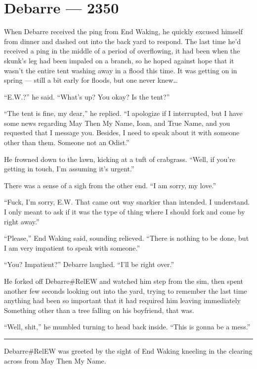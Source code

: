 \hypertarget{debarre-2350}{%
\chapter{Debarre — 2350}\label{debarre-2350}}

When Debarre received the ping from End Waking, he quickly excused himself from dinner and dashed out into the back yard to respond. The last time he'd received a ping in the middle of a period of overflowing, it had been when the skunk's leg had been impaled on a branch, so he hoped against hope that it wasn't the entire tent washing away in a flood this time. It was getting on in spring — still a bit early for floods, but one never knew\ldots{}

``E.W.?'' he said. ``What's up? You okay? Is the tent?''

``The tent is fine, my dear,'' he replied. ``I apologize if I interrupted, but I have some news regarding May Then My Name, Ioan, and True Name, and you requested that I message you. Besides, I need to speak about it with someone other than them. Someone not an Odist.''

He frowned down to the lawn, kicking at a tuft of crabgrass. ``Well, if you're getting in touch, I'm assuming it's urgent.''

There was a sense of a sigh from the other end. ``I am sorry, my love.''

``Fuck, I'm sorry, E.W. That came out way snarkier than intended. I understand. I only meant to ask if it was the type of thing where I should fork and come by right away.''

``Please,'' End Waking said, sounding relieved. ``There is nothing to be done, but I am very impatient to speak with someone.''

``You? Impatient?'' Debarre laughed. ``I'll be right over.''

He forked off Debarre\#RelEW and watched him step from the sim, then spent another few seconds looking out into the yard, trying to remember the last time anything had been so important that it had required him leaving immediately Something other than a tree falling on his boyfriend, that was.

``Well, shit,'' he mumbled turning to head back inside. ``This is gonna be a mess.''

\begin{center}\rule{0.5\linewidth}{0.5pt}\end{center}

Debarre\#RelEW was greeted by the sight of End Waking kneeling in the clearing across from May Then My Name.

